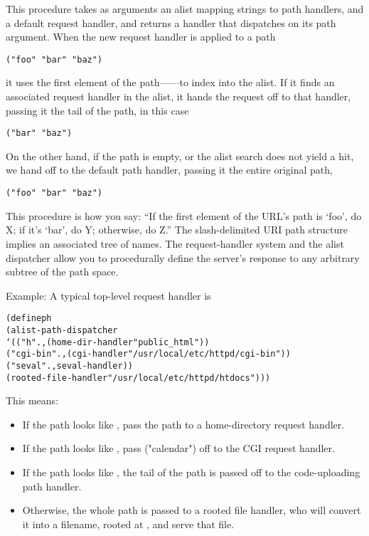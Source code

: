 \begin{desc}
  This procedure takes as arguments an alist mapping strings to path
  handlers, and a default request handler, and returns a handler that
  dispatches on its path argument.  When the new request handler is
  applied to a path 
\begin{verbatim}
("foo" "bar" "baz")
\end{verbatim}
  it uses the
  first element of the path------to index into the
  alist.  If it finds an associated request handler in the alist, it
  hands the request off to that handler, passing it the tail of the
  path, in this case
\begin{verbatim}
("bar" "baz")
\end{verbatim}
  On the other hand, if the path is
  empty, or the alist search does not yield a hit, we hand off to the
  default path handler, passing it the entire original path,
\begin{verbatim}
("foo" "bar" "baz")
\end{verbatim}
  This procedure is how you say: ``If the first element of the URL's
  path is `foo', do X; if it's `bar', do Y; otherwise, do Z.''
  The slash-delimited URI path structure implies an associated tree of
  names. The request-handler system and the alist dispatcher allow you to
  procedurally define the server's response to any arbitrary subtree
  of the path space.
          
  Example: A typical top-level request handler is
\begin{alltt}          
(define ph
  (alist-path-dispatcher
      `(("h"       . ,(home-dir-handler "public\_html"))
        ("cgi-bin" . ,(cgi-handler "/usr/local/etc/httpd/cgi-bin"))
        ("seval"   . ,seval-handler))
      (rooted-file-handler "/usr/local/etc/httpd/htdocs")))
\end{alltt}
    
    This means:
\begin{itemize}          
\item If the path looks like , pass the path
   to a
  home-directory request handler.
\item If the path looks like ,
    pass ("calendar") off to the CGI request handler.
  \item If the path looks like , the tail
    of the path is passed off to the code-uploading  path
    handler.
  \item Otherwise, the whole path is passed to a rooted file handler,
    who will convert it into a filename, rooted at
    ,
    and serve that file.
\end{itemize}
\end{desc}

